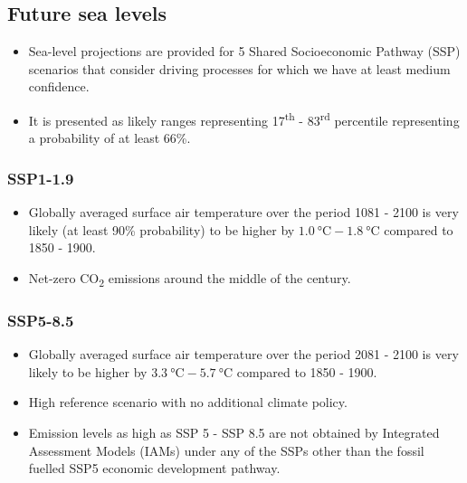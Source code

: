 \documentclass[11pt]{article}
\begin{document}
\newpage
\subsection{Future sea levels}
\label{sec:orgdedc8a1}
\begin{itemize}
\item Sea-level projections are provided for 5 Shared Socioeconomic Pathway (SSP) scenarios that consider driving processes for which we have at least medium confidence.
\item It is presented as likely ranges representing 17\textsuperscript{th} - 83\textsuperscript{rd} percentile representing a probability of at least 66\%.
\end{itemize}
\subsubsection{SSP1-1.9}
\label{sec:org159ad6c}
\begin{itemize}
\item Globally averaged surface air temperature over the period 1081 - 2100 is very likely (at least 90\% probability) to be higher by \(\qty{1.0}{\degreeCelsius} - \qty{1.8}{\degreeCelsius}\) compared to 1850 - 1900.
\item Net-zero CO\textsubscript{2} emissions around the middle of the century.
\end{itemize}
\subsubsection{SSP5-8.5}
\label{sec:orgf320cc8}
\begin{itemize}
\item Globally averaged surface air temperature over the period 2081 - 2100 is very likely to be higher by \(\qty{3.3}{\degreeCelsius} - \qty{5.7}{\degreeCelsius}\) compared to 1850 - 1900.
\item High reference scenario with no additional climate policy.
\item Emission levels as high as SSP 5 - SSP 8.5 are not obtained by Integrated Assessment Models (IAMs) under any of the SSPs other than the fossil fuelled SSP5 economic development pathway.
\end{itemize}
\end{document}

